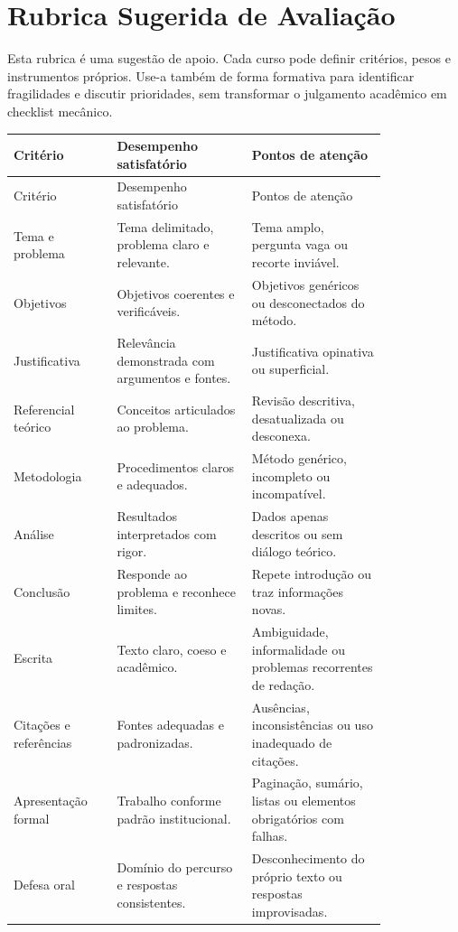 \chapter{Rubrica Sugerida de Avaliação}

Esta rubrica é uma sugestão de apoio. Cada curso pode definir critérios, pesos e instrumentos próprios. Use-a também de forma formativa para identificar fragilidades e discutir prioridades, sem transformar o julgamento acadêmico em checklist mecânico.

\begin{longtable}{p{0.22\linewidth}p{0.30\linewidth}p{0.30\linewidth}}
\toprule
Critério & Desempenho satisfatório & Pontos de atenção \\
\midrule
\endfirsthead
\toprule
Critério & Desempenho satisfatório & Pontos de atenção \\
\midrule
\endhead
Tema e problema & Tema delimitado, problema claro e relevante. & Tema amplo, pergunta vaga ou recorte inviável. \\
Objetivos & Objetivos coerentes e verificáveis. & Objetivos genéricos ou desconectados do método. \\
Justificativa & Relevância demonstrada com argumentos e fontes. & Justificativa opinativa ou superficial. \\
Referencial teórico & Conceitos articulados ao problema. & Revisão descritiva, desatualizada ou desconexa. \\
Metodologia & Procedimentos claros e adequados. & Método genérico, incompleto ou incompatível. \\
Análise & Resultados interpretados com rigor. & Dados apenas descritos ou sem diálogo teórico. \\
Conclusão & Responde ao problema e reconhece limites. & Repete introdução ou traz informações novas. \\
Escrita & Texto claro, coeso e acadêmico. & Ambiguidade, informalidade ou problemas recorrentes de redação. \\
Citações e referências & Fontes adequadas e padronizadas. & Ausências, inconsistências ou uso inadequado de citações. \\
Apresentação formal & Trabalho conforme padrão institucional. & Paginação, sumário, listas ou elementos obrigatórios com falhas. \\
Defesa oral & Domínio do percurso e respostas consistentes. & Desconhecimento do próprio texto ou respostas improvisadas. \\
\bottomrule
\end{longtable}
